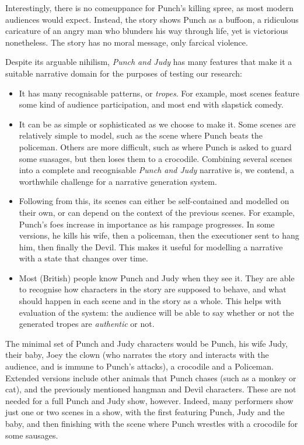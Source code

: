 \documentclass[11pt]{report}
\begin{document}
Interestingly, there is no comeuppance for Punch's killing spree, as most modern
audiences would expect. Instead, the story shows Punch as a buffoon, a
ridiculous caricature of an angry man who blunders his way through life, yet is
victorious nonetheless. The story has no moral message, only farcical violence.

Despite its arguable nihilism, \emph{Punch and Judy} has many features that make
it a suitable narrative domain for the purposes of testing our research:

\begin{itemize}
\item It has many recognisable patterns, or \emph{tropes}. For example, most
  scenes feature some kind of audience participation, and most end with
  slapstick comedy.
\item It can be as simple or sophisticated as we choose to make it. Some scenes
  are relatively simple to model, such as the scene where Punch beats the
  policeman. Others are more difficult, such as where Punch is asked to guard
  some suasages, but then loses them to a crocodile. Combining several scenes
  into a complete and recognisable \emph{Punch and Judy} narrative is, we
  contend, a worthwhile challenge for a narrative generation system.
\item Following from this, its scenes can either be self-contained and modelled
  on their own, or can depend on the context of the previous scenes. For
  example, Punch's foes increase in importance as his rampage progresses. In some
  versions, he kills his wife, then a policeman, then the executioner sent to
  hang him, then finally the Devil. This makes it useful for modelling a
  narrative with a state that changes over time.
\item Most (British) people know Punch and Judy when they see it. They are able
  to recognise how characters in the story are supposed to behave, and what
  should happen in each scene and in the story as a whole. This helps with
  evaluation of the system: the audience will be able to say whether or not the
  generated tropes are \emph{authentic} or not.
\end{itemize}

The minimal set of Punch and Judy characters would be Punch, his wife Judy,
their baby, Joey the clown (who narrates the story and interacts with the
audience, and is immune to Punch's attacks), a crocodile and a Policeman.
Extended versions include other animals that Punch chases (such as a monkey or
cat), and the previously mentioned hangman and Devil characters. These are not
needed for a full Punch and Judy show, however. Indeed, many performers show
just one or two scenes in a show, with the first featuring Punch, Judy and the
baby, and then finishing with the scene where Punch wrestles with a crocodile
for some sausages.
\end{document}
